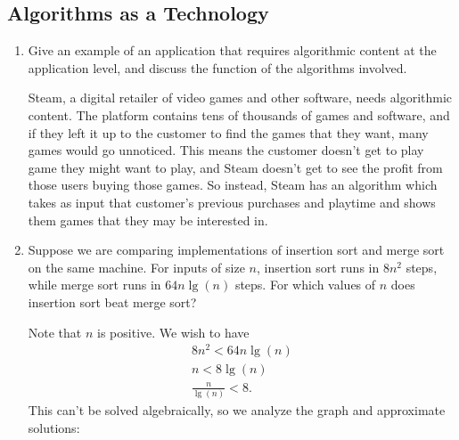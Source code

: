 \documentclass[Chapter01]{subfiles}
\begin{document}
	\subsection{Algorithms as a Technology}

	\begin{enumerate}
		\item Give an example of an application that requires algorithmic content at the application level, and discuss the function of the algorithms involved.
		\begin{answer}
			Steam, a digital retailer of video games and other software, needs algorithmic content. The platform contains tens of thousands of games and software, and if they left it up to the customer to find the games that they want, many games would go unnoticed. This means the customer doesn't get to play game they might want to play, and Steam doesn't get to see the profit from those users buying those games. So instead, Steam has an algorithm which takes as input that customer's previous purchases and playtime and shows them games that they may be interested in.
		\end{answer}

		\item Suppose we are comparing implementations of insertion sort and merge sort on the same machine. For inputs of size $n$, insertion sort runs in $8n^2$ steps, while merge sort runs in $64n \lg(n)$ steps. For which values of $n$ does insertion sort beat merge sort?
		\begin{answer}
			Note that $n$ is positive. We wish to have
			\begin{align*}
				8n^2 < 64n \lg(n) \tag*{$\impliedby$}\\
				n < 8 \lg(n) \tag*{$\impliedby$}\\
				\frac{n}{\lg(n)} < 8.
			\end{align*}
			This can't be solved algebraically, so we analyze the graph and approximate solutions:
			\begin{figure}[h]
				\centering
			\end{figure}


\end{answer}
\end{enumerate}
\end{document}
